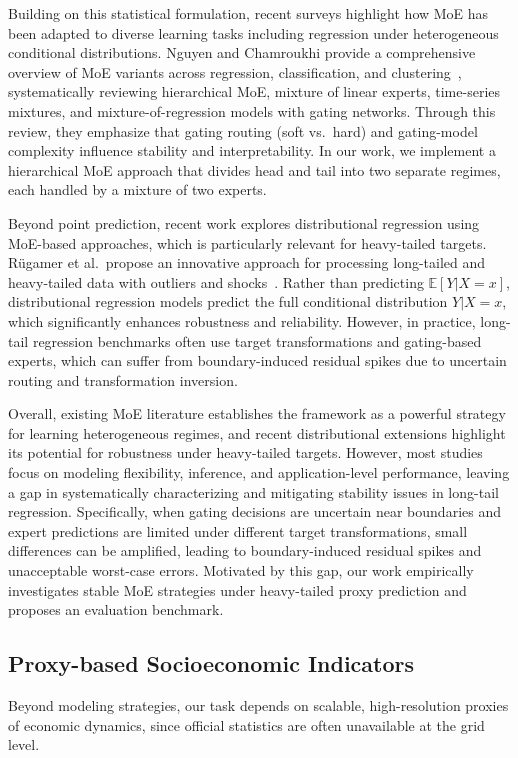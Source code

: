 \documentclass[preprint,12pt]{elsarticle}
\begin{document}
Building on this statistical formulation, recent surveys highlight how MoE has been adapted to diverse learning tasks including regression under heterogeneous conditional distributions. Nguyen and Chamroukhi provide a comprehensive overview of MoE variants across regression, classification, and clustering~\cite{nguyen2018overviewmoe}, systematically reviewing hierarchical MoE, mixture of linear experts, time-series mixtures, and mixture-of-regression models with gating networks. Through this review, they emphasize that gating routing (soft vs.\ hard) and gating-model complexity influence stability and interpretability. In our work, we implement a hierarchical MoE approach that divides head and tail into two separate regimes, each handled by a mixture of two experts.

Beyond point prediction, recent work explores distributional regression using MoE-based approaches, which is particularly relevant for heavy-tailed targets. Rügamer et al.\ propose an innovative approach for processing long-tailed and heavy-tailed data with outliers and shocks~\cite{rugamer2024mixdistreg}. Rather than predicting $\mathbb{E}[Y|X = x]$, distributional regression models predict the full conditional distribution $Y|X=x$, which significantly enhances robustness and reliability. However, in practice, long-tail regression benchmarks often use target transformations and gating-based experts, which can suffer from boundary-induced residual spikes due to uncertain routing and transformation inversion.

Overall, existing MoE literature establishes the framework as a powerful strategy for learning heterogeneous regimes, and recent distributional extensions highlight its potential for robustness under heavy-tailed targets. However, most studies focus on modeling flexibility, inference, and application-level performance, leaving a gap in systematically characterizing and mitigating stability issues in long-tail regression. Specifically, when gating decisions are uncertain near boundaries and expert predictions are limited under different target transformations, small differences can be amplified, leading to boundary-induced residual spikes and unacceptable worst-case errors. Motivated by this gap, our work empirically investigates stable MoE strategies under heavy-tailed proxy prediction and proposes an evaluation benchmark.

\subsection{Proxy-based Socioeconomic Indicators}
Beyond modeling strategies, our task depends on scalable, high-resolution proxies of economic dynamics, since official statistics are often unavailable at the grid level.
\end{document}
